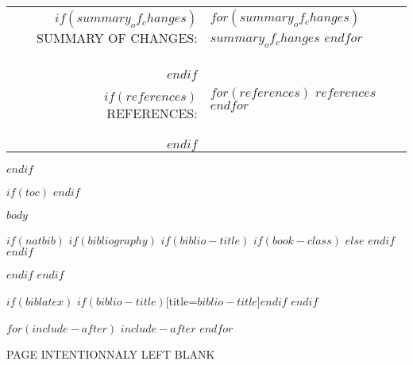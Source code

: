 \documentclass[$if(fontsize)$$fontsize$,$endif$$if(lang)$$babel-lang$,$endif$$if(papersize)$$papersize$paper,$endif$$for(classoption)$$classoption$$sep$,$endfor$]{$documentclass$}
\begin{document}
\begin{minipage}{\textwidth}
\begin{center}
\begin{tabular}{ r l }
                $if(summary_of_changes)$
                {\color{gray}SUMMARY OF CHANGES:}           & \parbox[t]{8cm}{$for(summary_of_changes)$ $summary_of_changes$ \\ $endfor$} \\

                \null & \null \\
                $endif$

                $if(references)$
                {\color{gray}REFERENCES:}                   & \parbox[t]{8cm}{$for(references)$ $references$ \\ $endfor$} \\
                $endif$

            \end{tabular}
        \end{center}
    \end{minipage}
    \vfill
    \newpage
$endif$


\vspace*{1cm}

$if(toc)$
    {
        \hypersetup{linkcolor=$if(toccolor)$$toccolor$$else$black$endif$}
        \setcounter{tocdepth}{$toc-depth$}
        \tableofcontents
        \clearpage
        \newpage
    }
$endif$

\pagestyle{fancy}
$body$
\newpage

$if(natbib)$
    $if(bibliography)$
        $if(biblio-title)$
            $if(book-class)$
                \renewcommand\bibname{$biblio-title$}
            $else$
                \renewcommand\refname{$biblio-title$}
            $endif$
        $endif$
        
        \newpage
    $endif$
$endif$

\iftotalfigures{}\listoffigures\newpage\fi
\iftotaltables{}\listoftables\newpage\fi

%

$if(biblatex)$
    \printbibliography$if(biblio-title)$[title=$biblio-title$]$endif$
    \newpage
$endif$

$for(include-after)$
    $include-after$
    \newpage
$endfor$
\newpage
\thispagestyle{empty}
\clearpage
\vspace*{\fill}
\begin{center}
\begin{minipage}{.6\textwidth}
\centering PAGE INTENTIONNALY LEFT BLANK
\end{minipage}
\end{center}
\vfill %
\clearpage
\end{document}

